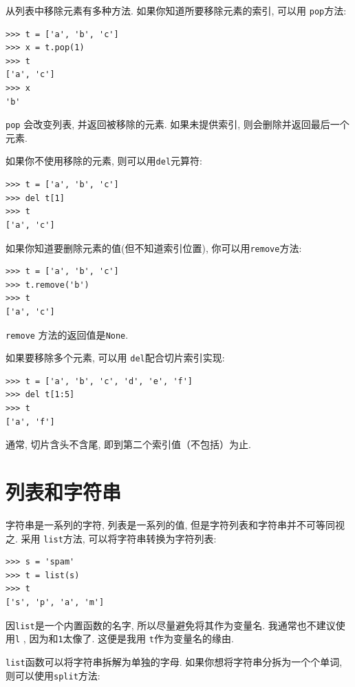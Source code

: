 \documentclass[10pt]{book}
\begin{document}
从列表中移除元素有多种方法. 
如果你知道所要移除元素的索引, 可以用
{\tt pop}方法:

\begin{verbatim}
>>> t = ['a', 'b', 'c']
>>> x = t.pop(1)
>>> t
['a', 'c']
>>> x
'b'
\end{verbatim}
%
{\tt pop} 会改变列表, 并返回被移除的元素. 
如果未提供索引, 则会删除并返回最后一个元素. 

如果你不使用移除的元素, 则可以用{\tt del}元算符:

\begin{verbatim}
>>> t = ['a', 'b', 'c']
>>> del t[1]
>>> t
['a', 'c']
\end{verbatim}
%
如果你知道要删除元素的值(但不知道索引位置), 你可以用{\tt remove}方法:

\begin{verbatim}
>>> t = ['a', 'b', 'c']
>>> t.remove('b')
>>> t
['a', 'c']
\end{verbatim}
%
{\tt remove} 方法的返回值是{\tt None}.

如果要移除多个元素, 可以用 {\tt del}配合切片索引实现:

\begin{verbatim}
>>> t = ['a', 'b', 'c', 'd', 'e', 'f']
>>> del t[1:5]
>>> t
['a', 'f']
\end{verbatim}
%
通常, 切片含头不含尾, 即到第二个索引值（不包括）为止. 



\section{列表和字符串}

字符串是一系列的字符, 列表是一系列的值, 但是字符列表和字符串并不可等同视之. 
采用 {\tt list}方法, 可以将字符串转换为字符列表:

\begin{verbatim}
>>> s = 'spam'
>>> t = list(s)
>>> t
['s', 'p', 'a', 'm']
\end{verbatim}
%
因{\tt list}是一个内置函数的名字, 所以尽量避免将其作为变量名. 
我通常也不建议使用{\tt l} , 因为和{\tt 1}太像了. 这便是我用
{\tt t}作为变量名的缘由. 

{\tt list}函数可以将字符串拆解为单独的字母. 
如果你想将字符串分拆为一个个单词, 则可以使用{\tt split}方法:
\end{document}
